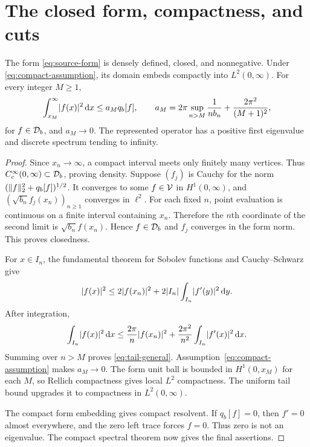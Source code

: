\section{The closed form, compactness, and cuts}
\label{sec:forms}

\begin{proposition}
\label{prop:compact}
The form \eqref{eq:source-form} is densely defined, closed, and
nonnegative. Under \eqref{eq:compact-assumption}, its domain embeds
compactly into $L^2(0,\infty)$. For every integer $M\ge1$,
\begin{equation}
 \int_{x_M}^\infty\lvert f(x)\rvert^2\,\mathrm d x\le a_Mq_b[f],
 \qquad
 a_M=2\pi\sup_{n>M}\frac1{n b_n}
                 +\frac{2\pi^2}{(M+1)^2},
 \label{eq:tail-general}
\end{equation}
for $f\in\mathcal D_b$, and $a_M\to0$. The represented operator has a
positive first eigenvalue and discrete spectrum tending to infinity.
\end{proposition}

\begin{proof}
Since $x_n\to\infty$, a compact interval meets only finitely many
vertices. Thus $C_c^\infty(0,\infty)\subset\mathcal D_b$, proving density.
Suppose $(f_j)$ is Cauchy for the norm
$(\lVert f\rVert_2^2+q_b[f])^{1/2}$. It converges to some $f\in\mathcal V$
in $H^1(0,\infty)$, and
$(\sqrt{b_n}f_j(x_n))_{n\ge1}$ converges in $\ell^2$.
For each fixed $n$, point evaluation is continuous on a finite
interval containing $x_n$. Therefore the $n$th coordinate of the
second limit is $\sqrt{b_n}f(x_n)$. Hence $f\in\mathcal D_b$ and $f_j$
converges in the form norm. This proves closedness.

For $x\in I_n$, the fundamental theorem for Sobolev functions and
Cauchy--Schwarz give
\[
 \lvert f(x)\rvert^2\le 2\lvert f(x_n)\rvert^2
      +2\lvert I_n\rvert\int_{I_n}\lvert f'(y)\rvert^2\,\mathrm d y.
\]
After integration,
\begin{equation}
 \int_{I_n}\lvert f(x)\rvert^2\,\mathrm d x
 \le \frac{2\pi}{n}\lvert f(x_n)\rvert^2
          +\frac{2\pi^2}{n^2}\int_{I_n}\lvert f'(x)\rvert^2\,\mathrm d x.
 \label{eq:cell-tail}
\end{equation}
Summing over $n>M$ proves \eqref{eq:tail-general}.
Assumption~\eqref{eq:compact-assumption} makes $a_M\to0$.
The form unit ball is bounded in $H^1(0,x_M)$ for each $M$, so
Rellich compactness gives local $L^2$ compactness. The uniform tail
bound upgrades it to compactness in $L^2(0,\infty)$.

The compact form embedding gives compact resolvent. If $q_b[f]=0$,
then $f'=0$ almost everywhere, and the zero left trace forces $f=0$.
Thus zero is not an eigenvalue. The compact spectral theorem now
gives the final assertions.
\end{proof}

